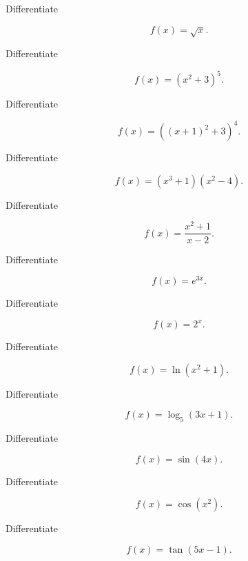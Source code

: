 \begin{exercise}[1]
Differentiate

\[
f(x)=\sqrt{x}.
\]
\end{exercise}

\begin{exercise}[2]
Differentiate

\[
f(x)
=
(x^2+3)^5.
\]
\end{exercise}

\begin{exercise}[2]
Differentiate

\[
f(x)
=
\left(
(x+1)^2+3
\right)^4.
\]
\end{exercise}

\begin{exercise}[2]
Differentiate

\[
f(x)
=
(x^3+1)(x^2-4).
\]
\end{exercise}

\begin{exercise}[2]
Differentiate

\[
f(x)
=
\frac{x^2+1}{x-2}.
\]
\end{exercise}

\begin{exercise}[2]
Differentiate

\[
f(x)=e^{3x}.
\]
\end{exercise}

\begin{exercise}[2]
Differentiate

\[
f(x)=2^x.
\]
\end{exercise}

\begin{exercise}[2]
Differentiate

\[
f(x)=\ln(x^2+1).
\]
\end{exercise}

\begin{exercise}[2]
Differentiate

\[
f(x)=\log_5(3x+1).
\]
\end{exercise}

\begin{exercise}[2]
Differentiate

\[
f(x)=\sin(4x).
\]
\end{exercise}

\begin{exercise}[2]
Differentiate

\[
f(x)=\cos(x^2).
\]
\end{exercise}

\begin{exercise}[2]
Differentiate

\[
f(x)=\tan(5x-1).
\]
\end{exercise}

